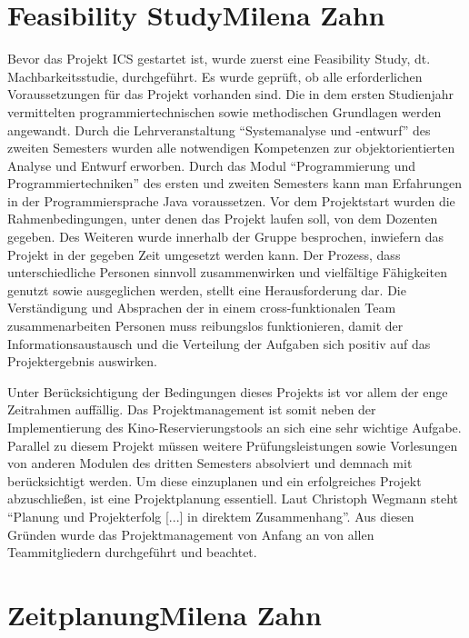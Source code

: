 	\section[Feasibility Study]{Feasibility Study{\hfill \normalsize Milena Zahn}}
	Bevor das Projekt \ac{ICS} gestartet ist, wurde zuerst eine Feasibility Study, dt. Machbarkeitsstudie, durchgeführt. Es wurde geprüft, ob alle erforderlichen Voraussetzungen für das Projekt vorhanden sind. Die in dem ersten Studienjahr vermittelten programmiertechnischen sowie methodischen Grundlagen werden angewandt. Durch die Lehrveranstaltung \enquote{Systemanalyse und -entwurf} des zweiten Semesters wurden alle notwendigen Kompetenzen zur objektorientierten Analyse und Entwurf erworben. Durch das Modul \enquote{Programmierung und Programmiertechniken} des ersten und zweiten Semesters kann man Erfahrungen in der Programmiersprache Java voraussetzen. Vor dem Projektstart wurden die Rahmenbedingungen, unter denen das Projekt laufen soll, von dem Dozenten gegeben. Des Weiteren wurde innerhalb der Gruppe besprochen, inwiefern das Projekt in der gegeben Zeit umgesetzt werden kann. Der Prozess, dass unterschiedliche Personen sinnvoll zusammenwirken und vielfältige Fähigkeiten genutzt sowie ausgeglichen werden, stellt eine Herausforderung dar. Die Verständigung und Absprachen der in einem cross-funktionalen Team zusammenarbeiten Personen muss reibungslos funktionieren, damit der Informationsaustausch und die Verteilung der Aufgaben sich positiv auf das Projektergebnis auswirken.
	
	Unter Berücksichtigung der Bedingungen dieses Projekts ist vor allem der enge Zeitrahmen auffällig. Das Projektmanagement ist somit neben der Implementierung des Kino-Reservierungstools an sich eine sehr wichtige Aufgabe. Parallel zu diesem Projekt müssen weitere Prüfungsleistungen sowie Vorlesungen von anderen Modulen des dritten Semesters absolviert und demnach mit berücksichtigt werden. Um diese einzuplanen und ein erfolgreiches Projekt abzuschließen, ist eine Projektplanung essentiell. Laut Christoph Wegmann steht \enquote{Planung und Projekterfolg [...] in direktem Zusammenhang}\autocite[][S. 73]{projektmanagement}. Aus diesen Gründen wurde das Projektmanagement von Anfang an von allen Teammitgliedern durchgeführt und beachtet.
	
	\section[Zeitplanung]{Zeitplanung{\hfill \normalsize Milena Zahn}} \label{projektplan}
